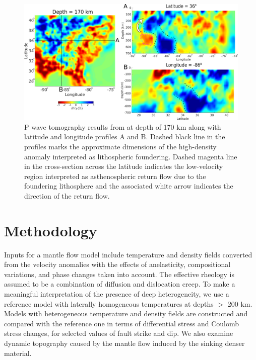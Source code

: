 \documentclass[draft,linenumbers]{agujournal2018}
\begin{document}
\begin{figure}[ht]
    \centering
    \includegraphics[width=\linewidth]{figures/figure_tomography.png}
    \caption{ P wave tomography results from \citep{Biryol_2016} at depth of 170 km along with latitude and longitude profiles A and B. Dashed black line in the profiles marks the approximate dimensions of the high-density anomaly interpreted as lithospheric foundering. Dashed magenta line in the cross-section across the latitude indicates the low-velocity region interpreted as asthenospheric return flow due to the foundering lithosphere and the associated white arrow indicates the direction of the return flow.}
    \label{fig_tomo}
 \end{figure}

\section{Methodology}
    Inputs for a mantle flow model include temperature and density fields converted from the velocity anomalies with the effects of anelasticity, compositional variations, and phase changes taken into account. The effective rheology is assumed to be a combination of diffusion and dislocation creep. To make a meaningful interpretation of the presence of deep heterogeneity, we use a reference model with laterally homogeneous temperatures at depths $>$ 200 km. Models with heterogeneous temperature and density fields are constructed and compared with the reference one in terms of differential stress and Coulomb stress changes, for selected values of fault strike and dip. We also examine dynamic topography caused by the mantle flow induced by the sinking denser material. 
    
\end{document}
